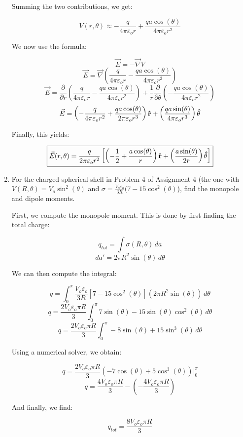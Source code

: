 \begin{enumerate}
    Summing the two contributions, we get:

    $$V(r,\theta)\approx-\frac{q}{4\pi\varepsilon_o r}+\frac{qa\cos(\theta)}{4\pi\varepsilon_or^2}$$

    We now use the formula:

    $$\vec{E}=-\vec{\nabla}V$$
    $$\vec{E}=\vec{\nabla}\left(  \frac{q}{4\pi\varepsilon_or}-\frac{qa\cos(\theta)}{4\pi\varepsilon_or^2}\right)$$
    $$\vec{E}=\frac{\partial}{\partial r}\left(  \frac{q}{4\pi\varepsilon_or}-\frac{qa\cos(\theta)}{4\pi\varepsilon_or^2}\right)+\frac{1}{r}\frac{\partial}{\partial\theta}\left(-\frac{qa\cos(\theta)}{4\pi\varepsilon_or^2}\right)$$
    $$\vec{E}=\left(  -\frac{q}{4\pi\varepsilon_or^2}+\frac{qa\cos(\theta)}{2\pi\varepsilon_or^3}\right)\bold{\hat{r}}+\left(\frac{qa\sin(\theta)}{4\pi\varepsilon_or^3}\right)\bold{\hat{\theta}}$$

    Finally, this yields:

    $$\boxed{\vec{E}(r,\theta)=\frac{q}{2\pi\varepsilon_or^2}\left[ \left( -\frac{1}{2}+\frac{a\cos(\theta)}{r} \right)\bold{\hat{r}} +\left( \frac{a\sin(\theta)}{2r} \right)\bold{\hat{\theta}}\right]}$$

  \item For the charged spherical shell in Problem 4 of Assignment 4 (the one with $V(R,\theta)=V_o\sin^2(\theta)$ and $\sigma=\frac{V_o\varepsilon_o}{3R}(7-15\cos^2(\theta)$), find the monopole and dipole moments.

      First, we compute the monopole moment. This is done by first finding the total charge:

      $$q_{tot}=\int\sigma(R,\theta)\,da$$
      $$da'=2\pi R^2\sin(\theta)\,d\theta$$

      We can then compute the integral:

      $$q=\int_0^\pi\frac{V_o\varepsilon_o}{3R}[7-15\cos^2(\theta)](2\pi R^2\sin(\theta))\,d\theta$$
      $$q=\frac{2V_o\varepsilon_o\pi R}{3}\int_0^\pi 7\sin(\theta)-15\sin(\theta)\cos^2(\theta)\,d\theta$$
      $$q=\frac{2V_o\varepsilon_o\pi R}{3}\int_0^\pi -8\sin(\theta)+15\sin^3(\theta)\,d\theta$$

      Using a numerical solver, we obtain:

      $$q=\frac{2V_o\varepsilon_o\pi R}{3}\left( -7\cos(\theta)+5\cos^3(\theta)\right)\Big|_0^\pi$$
      $$q=\frac{4V_o\varepsilon_o\pi R}{3}-\left( -\frac{4V_o\varepsilon_o\pi R}{3} \right)$$

      And finally, we find:

      $$\boxed{q_{tot}=\frac{8V_o\varepsilon_o\pi R}{3}}$$


\end{enumerate}
